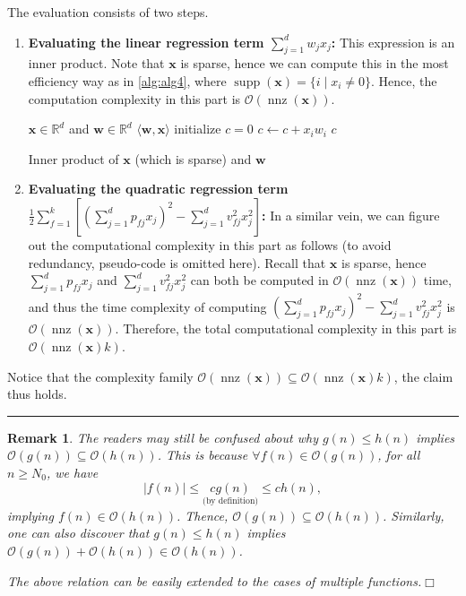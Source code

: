 \documentclass[twoside]{article}
\newcommand{\qedwhite}{\hfill \ensuremath{\Box}}
\newcommand{\abs}[1]{\left\lvert#1\right\rvert}
\newtheorem{remark}[theorem]{Remark}
\newenvironment{proof}{{\bf Explanation:}}{\hfill\rule{2mm}{2mm}}
\begin{document}
\begin{proof}
    The evaluation consists of two steps.
    \begin{enumerate}[leftmargin=*]
        \item {\bf Evaluating the linear regression term $\sum_{j=1}^{d}w_{j}x_{j}$:} This expression is an inner product. Note that $\boldsymbol{x}$ is sparse, hence we can compute this in the most efficiency way as in \autoref{alg:alg4}, where $\operatorname{supp}(\boldsymbol{x})=\{i\mid x_{i}\neq 0\}$. Hence, the computation complexity in this part is $\mathcal{O}(\operatorname{nnz}(\boldsymbol{x}))$.
    
\begin{algorithm}[!ht]
\begin{algorithmic}[1]
\REQUIRE $\boldsymbol{x}\in\mathbb{R}^{d}$ and $\boldsymbol{w}\in\mathbb{R}^{d}$
\ENSURE $\langle\boldsymbol{w}, \boldsymbol{x}\rangle$
\STATE initialize $c=0$
\STATE $c\leftarrow c+x_{i}w_{i}$
\ENDFOR
\RETURN $c$
\end{algorithmic}
\caption{Inner product of $\boldsymbol{x}$ (which is sparse) and $\boldsymbol{w}$}
\label{alg:alg4}
\end{algorithm}

        \item {\bf Evaluating the quadratic regression term $\frac{1}{2} \sum_{f=1}^{k}[(\sum_{j=1}^{d} p_{fj} x_{j})^{2}-\sum_{j=1}^{d} v_{fj}^{2} x_{j}^{2}]$:} In a similar vein, we can figure out the computational complexity in this part as follows (to avoid redundancy, pseudo-code is omitted here). Recall that $\boldsymbol{x}$ is sparse, hence $\sum_{j=1}^{d} p_{fj} x_{j}$ and $\sum_{j=1}^{d} v_{fj}^{2} x_{j}^{2}$ can both be computed in $\mathcal{O}(\operatorname{nnz}(\boldsymbol{x}))$ time, and thus the time complexity of computing $(\sum_{j=1}^{d} p_{fj} x_{j})^{2}-\sum_{j=1}^{d} v_{fj}^{2} x_{j}^{2}$ is $\mathcal{O}(\operatorname{nnz}(\boldsymbol{x}))$. Therefore, the total computational complexity in this part is $\mathcal{O}(\operatorname{nnz}(\boldsymbol{x})k)$.
    \end{enumerate}
    Notice that the complexity family $\mathcal{O}(\operatorname{nnz}(\boldsymbol{x}))\subseteq\mathcal{O}(\operatorname{nnz}(\boldsymbol{x})k)$, the claim thus holds.
\end{proof}

\begin{remark}\normalfont
    The readers may still be confused about why $g(n)\leq h(n)$ implies $\mathcal{O}(g(n))\subseteq\mathcal{O}(h(n))$. This is because $\forall f(n)\in\mathcal{O}(g(n))$, for all $n\geq N_{0}$, we have
    \begin{equation*}
        \abs{f(n)}\leq \underset{\text{(by definition)}}{cg(n)}\leq ch(n),
    \end{equation*}
    implying $f(n)\in\mathcal{O}(h(n))$. Thence, $\mathcal{O}(g(n))\subseteq\mathcal{O}(h(n))$. Similarly, one can also discover that $g(n)\leq h(n)$ implies $\mathcal{O}(g(n))+\mathcal{O}(h(n))\in\mathcal{O}(h(n))$.
    
    The above relation can be easily extended to the cases of multiple functions.\qedwhite
\end{remark}
\end{document}
